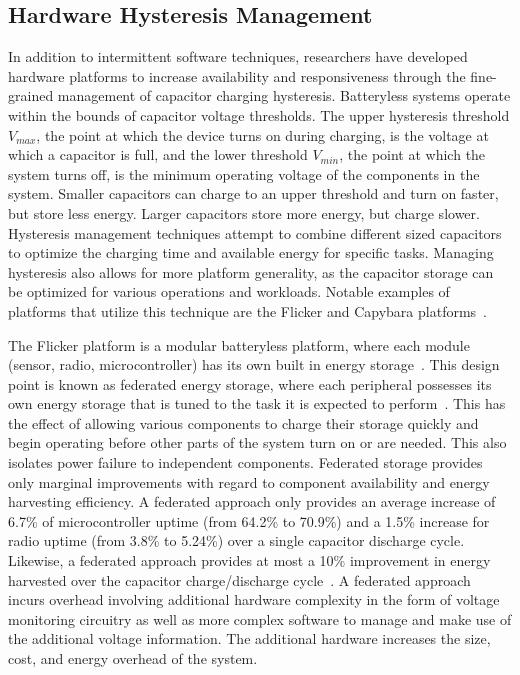 \subsection{Hardware Hysteresis Management}
In addition to intermittent software techniques, researchers have developed
hardware platforms to
increase availability and responsiveness through the fine-grained management
of capacitor charging hysteresis.
Batteryless systems operate within the bounds of capacitor voltage thresholds. The 
upper hysteresis threshold $V_{max}$, the point at which the device turns on during charging, is the voltage at which a capacitor is full, and the lower threshold $V_{min}$, the point at which the system turns off, is the minimum
operating voltage of the components in the system.
Smaller capacitors can charge to an upper
threshold and turn on faster, but store less energy.  Larger capacitors store more energy, but charge slower. 
Hysteresis management
techniques attempt to combine different sized capacitors to
optimize the charging time and available energy for specific tasks.
Managing hysteresis also allows for more platform generality, as the capacitor storage can be optimized for various operations and workloads. 
Notable examples of platforms that utilize this technique are the Flicker and Capybara platforms~\cite{hesterFlicker17, colinReconfigurable18}.

The Flicker
platform is a modular batteryless platform, where each module (sensor, radio, microcontroller) has its own built in energy storage~\cite{hesterFlicker17}. This design point is known as federated energy storage, where each peripheral possesses its own energy storage that is tuned to the task
it is expected to perform~\cite{hesterTragedy15}. This has the
effect of allowing various components to charge their storage quickly and begin operating before other parts of the system turn on or are needed. This also
isolates power failure to independent components.
Federated storage provides only marginal improvements with regard to component availability and energy harvesting efficiency. A federated approach only provides an average increase of 6.7\% of microcontroller uptime (from 64.2\% to 70.9\%) and a 1.5\% increase for radio uptime (from 3.8\% to 5.24\%) over a single capacitor discharge cycle. Likewise, a federated approach provides at most a 10\% improvement in energy harvested over the capacitor charge/discharge cycle~\cite{hesterTragedy15}.
A federated approach incurs overhead involving additional hardware complexity in the form of voltage monitoring circuitry as well as more complex software to manage and make use of the additional voltage information. The additional hardware increases the size, cost, and energy overhead of the system.


